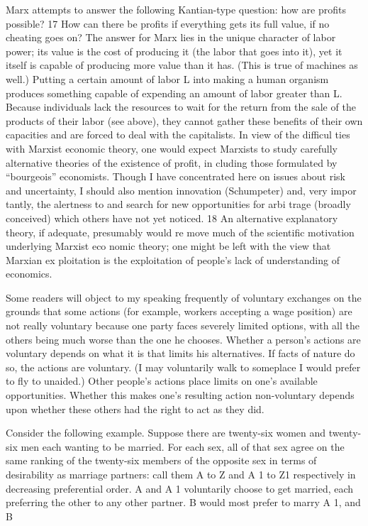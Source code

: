 \documentclass[11pt,openany]{book}
\begin{document}
Marx attempts to answer the following Kantian-type question: how are profits possible? 17 How can there be profits if everything gets its full value, if no cheating goes on? The answer for Marx lies in the unique character of labor power; its value is the cost of producing it (the labor that goes into it), yet it itself is capable of producing more value than it has. (This is true of machines as well.) Putting a certain amount of labor L into making a human organism produces something capable of expending an amount of labor greater than L. Because individuals lack the resources to wait for the return from the sale of the products of their labor (see above), they cannot gather these benefits of their own capacities and are forced to deal with the capitalists. In view of the difficul ties with Marxist economic theory, one would expect Marxists to study carefully alternative theories of the existence of profit, in cluding those formulated by ``bourgeois'' economists. Though I have concentrated here on issues about risk and uncertainty, I should also mention innovation (Schumpeter) and, very impor tantly, the alertness to and search for new opportunities for arbi trage (broadly conceived) which others have not yet noticed. 18 An alternative explanatory theory, if adequate, presumably would re move much of the scientific motivation underlying Marxist eco nomic theory; one might be left with the view that Marxian ex ploitation is the exploitation of people's lack of understanding of economics. 

Some readers will object to my speaking frequently of voluntary exchanges on the grounds that some actions (for example, workers accepting a wage position) are not really voluntary because one party faces severely limited options, with all the others being much worse than the one he chooses. Whether a person's actions are voluntary depends on what it is that limits his alternatives. If facts of nature do so, the actions are voluntary. (I may voluntarily walk to someplace I would prefer to fly to unaided.) Other people's actions place limits on one's available opportunities. Whether this makes one's resulting action non-voluntary depends upon whether these others had the right to act as they did. 

Consider the following example. Suppose there are twenty-six women and twenty-six men each wanting to be married. For each sex, all of that sex agree on the same ranking of the twenty-six members of the opposite sex in terms of desirability as marriage partners: call them A to Z and A 1 to Z1 respectively in decreasing preferential order. A and A 1 voluntarily choose to get married, each preferring the other to any other partner. B would most prefer to marry A 1, and B 
\end{document}
